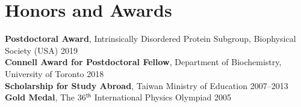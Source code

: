\documentclass[11pt]{../yhlcv}
\begin{document}
\section*{Honors and Awards}

\noindent
{\bf Postdoctoral Award}, Intrinsically Disordered Protein Subgroup, Biophysical Society (USA) \hfill 2019 \\
{\bf Connell Award for Postdoctoral Fellow}, Department of Biochemistry, University of Toronto \hfill 2018 \\
{\bf Scholarship for Study Abroad}, Taiwan Ministry of Education  \hfill 2007--2013 \\
{\bf Gold Medal}, The 36$^{ \mathsf{th}}$ International Physics Olympiad \hfill 2005
\end{document}
